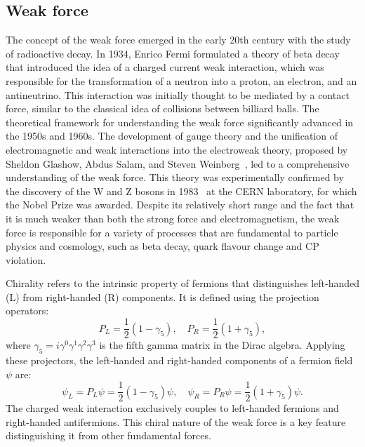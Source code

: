     \subsection{Weak force}
        The concept of the weak force emerged in the early 20th century with 
        the study of radioactive decay. In 1934, Enrico Fermi formulated a 
        theory of beta decay~\cite{Nanni_2019} that introduced the idea of a charged current weak interaction, 
        which was responsible for the transformation of a neutron into a proton,
        an electron, and an antineutrino. This interaction was initially thought 
        to be mediated by a contact force, similar to the classical idea of 
        collisions between billiard balls.
        The theoretical framework for understanding the weak force significantly 
        advanced in the 1950s and 1960s. The development of gauge theory and the 
        unification of electromagnetic and weak interactions into the electroweak 
        theory, proposed by Sheldon Glashow, Abdus Salam, and Steven Weinberg~\cite{PhysRev.127.965}, led 
        to a comprehensive understanding of the weak force. This theory was 
        experimentally confirmed by the discovery of the W and Z bosons in 1983~\cite{DiLella:2015yit} 
        at the CERN laboratory, for which the Nobel Prize was awarded.
        Despite its relatively short range and the fact that it is much weaker 
        than both the strong force and electromagnetism, the weak force is 
        responsible for a variety of processes that are fundamental to 
        particle physics and cosmology, such as beta decay, quark flavour change and
        CP violation.

        Chirality refers to the intrinsic property of fermions that distinguishes left-handed (L) 
        from right-handed (R) components. It is defined using the projection operators:
        \begin{equation}
            P_L = \frac{1}{2} (1 - \gamma_5), \quad P_R = \frac{1}{2} (1 + \gamma_5),
        \end{equation}
        where $ \gamma_5 = i\gamma^0\gamma^1\gamma^2\gamma^3 $ is the fifth gamma matrix in the Dirac algebra.
        Applying these projectors, the left-handed and right-handed components of a fermion field $\psi$ are:
        \begin{equation}
            \psi_L = P_L \psi = \frac{1}{2} (1 - \gamma_5) \psi, \quad \psi_R = P_R \psi = \frac{1}{2} (1 + \gamma_5) \psi.
        \end{equation}
        The charged weak interaction exclusively couples to left-handed fermions and right-handed antifermions. 
        This chiral nature of the weak force is a key feature distinguishing it from other fundamental forces.

